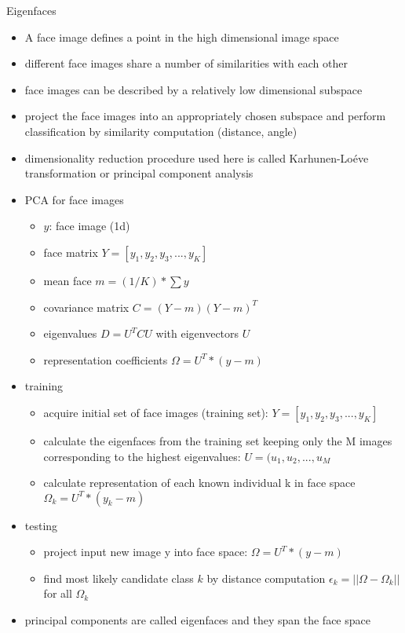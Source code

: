 \documentclass[paper=a4, fontsize=11pt]{scrartcl} %
\numberwithin{equation}{section} %
\numberwithin{figure}{section} %
\numberwithin{table}{section} %
\begin{document}
Eigenfaces
\begin{itemize}
\item A face image defines a point in the high dimensional image space
\item different face images share a number of similarities with each other
\item face images can be described by a relatively low dimensional subspace
\item project the face images into an appropriately chosen subspace and perform classification by similarity computation (distance, angle)
\item dimensionality reduction procedure used here is called Karhunen-Loéve transformation or principal component analysis
\item PCA for face images
\begin{itemize}
\item $y$: face image (1d)
\item face matrix $Y = [y_1,y_2,y_3,...,y_K]$
\item mean face $m = (1/K) * \sum y$
\item covariance matrix $C = (Y-m)(Y-m)^T$
\item eigenvalues $D = U^T CU$ with eigenvectors $U$
\item representation coefficients $\Omega = U^T * (y-m)$
\end{itemize}
\item training
\begin{itemize}
\item acquire initial set of face images (training set): $Y = [y_1,y_2,y_3,...,y_K]$
\item calculate the eigenfaces from the training set keeping only the M images corresponding to the highest eigenvalues: $U = (u_1,u_2,...,u_M$
\item calculate representation of each known individual k in face space $\Omega_k = U^T * (y_k - m)$
\end{itemize}
\item testing
\begin{itemize}
\item project input new image y into face space: $\Omega = U^T * (y-m)$
\item find most likely candidate class $k$ by distance computation $\epsilon_k = ||\Omega - \Omega_k||$ for all $\Omega_k$
\end{itemize}
\item principal components are called eigenfaces and they span the face space

\end{itemize}
\end{document}
